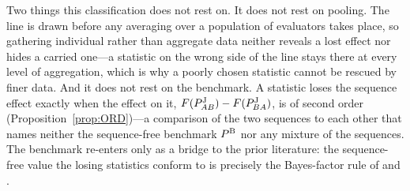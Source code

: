 Two things this classification does not rest on. It does not rest on pooling. The
line is drawn before any averaging over a population of evaluators takes place,
so gathering individual rather than aggregate data neither reveals a lost effect
nor hides a carried one---a statistic on the wrong side of the line stays there
at every level of aggregation, which is why a poorly chosen statistic cannot be
rescued by finer data. And it does not rest on the benchmark. A statistic loses
the sequence effect exactly when the effect on it,
$F(P^{\mathrm{J}}_{AB})-F(P^{\mathrm{J}}_{BA})$, is of second order (Proposition~\ref{prop:ORD})---a
comparison of the two sequences to each other that names neither the
sequence-free benchmark $P^{\mathrm{B}}$ nor any mixture of the sequences. The benchmark
re-enters only as a bridge to the prior literature: the sequence-free value the
losing statistics conform to is precisely the Bayes-factor rule of
\citet{Field1978} and \citet{Wagner2002}.
